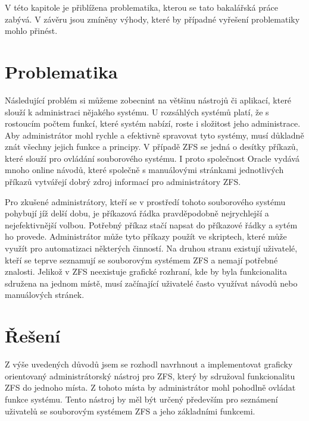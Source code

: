V této kapitole je přiblížena problematika, kterou se tato bakalářská práce zabývá. V závěru jsou zmíněny výhody, které by případné vyřešení problematiky mohlo přinést.

\section{Problematika}
Následující problém si můžeme zobecnint na většinu nástrojů či aplikací, které slouží k administraci nějakého systému. U rozsáhlých systémů platí, že s rostoucím počtem funkcí, které systém nabízí, roste i složitost jeho administrace. Aby administrátor mohl rychle a efektivně spravovat tyto systémy, musí důkladně znát všechny jejich funkce a principy. V případě ZFS se jedná o desítky příkazů, které slouží pro ovládání souborového systému. I proto společnost Oracle vydává mnoho online návodů, které společně s manuálovými stránkami jednotlivých příkazů vytvářejí dobrý zdroj informací pro administrátory ZFS.



Pro zkušené administrátory, kteří se v prostředí tohoto souborového systému pohybují jíž delší dobu, je příkazová řádka pravděpodobně nejrychlejší a nejefektivnější volbou. Potřebný příkaz stačí napsat do příkazové řádky a sytém ho provede. Administrátor může tyto příkazy použít ve skriptech, které může využít pro automatizaci některých činností. Na druhou stranu existují uživatelé, kteří se teprve seznamují se souborovým systémem ZFS a nemají potřebné znalosti. Jelikož v ZFS neexistuje grafické rozhraní, kde by byla funkcionalita sdružena na jednom místě, musí začínající uživatelé často využívat návodů nebo manuálových stránek.
\section{Řešení}
Z výše uvedených důvodů jsem se rozhodl navrhnout a implementovat graficky orientovaný administrátorský nástroj pro ZFS, který by sdružoval funkcionalitu ZFS do jednoho místa. Z tohoto místa by administrátor mohl pohodlně ovládat funkce systému. Tento nástroj by měl být určený především pro seznámení uživatelů se souborovým systémem ZFS a jeho základními funkcemi.
